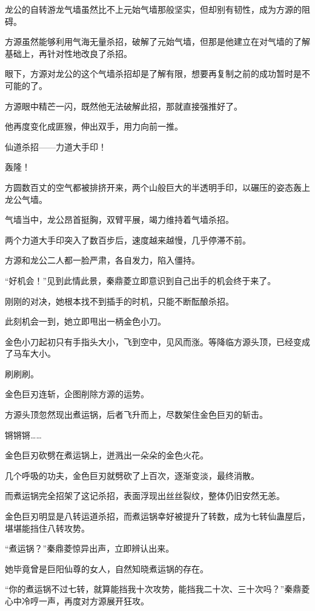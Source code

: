 \begin{this_body}
龙公的自转游龙气墙虽然比不上元始气墙那般坚实，但却别有韧性，成为方源的阻碍。

方源虽然能够利用气海无量杀招，破解了元始气墙，但那是他建立在对气墙的了解基础上，再针对性地改良了杀招。

眼下，方源对龙公的这个气墙杀招却是了解有限，想要再复制之前的成功暂时是不可能的了。

方源眼中精芒一闪，既然他无法破解此招，那就直接强推好了。

他再度变化成匪猴，伸出双手，用力向前一推。

仙道杀招——力道大手印！

轰隆！

方圆数百丈的空气都被排挤开来，两个山般巨大的半透明手印，以碾压的姿态轰上龙公气墙。

气墙当中，龙公昂首挺胸，双臂平展，竭力维持着气墙杀招。

两个力道大手印突入了数百步后，速度越来越慢，几乎停滞不前。

方源和龙公二人都一脸严肃，各自发力，陷入僵持。

“好机会！”见到此情此景，秦鼎菱立即意识到自己出手的机会终于来了。

刚刚的对决，她根本找不到插手的时机，只能不断酝酿杀招。

此刻机会一到，她立即甩出一柄金色小刀。

金色小刀起初只有手指头大小，飞到空中，见风而涨。等降临方源头顶，已经变成了马车大小。

刷刷刷。

金色巨刃连斩，企图削除方源的运势。

方源头顶忽然现出煮运锅，后者飞升而上，尽数架住金色巨刃的斩击。

锵锵锵……

金色巨刃砍劈在煮运锅上，迸溅出一朵朵的金色火花。

几个呼吸的功夫，金色巨刃就劈砍了上百次，逐渐变淡，最终消散。

而煮运锅完全招架了这记杀招，表面浮现出丝丝裂纹，整体仍旧安然无恙。

金色巨刃明显是八转运道杀招，而煮运锅幸好被提升了转数，成为七转仙蛊屋后，堪堪能挡住八转攻势。

“煮运锅？”秦鼎菱惊异出声，立即辨认出来。

她毕竟曾是巨阳仙尊的女人，自然知晓煮运锅的存在。

“你的煮运锅不过七转，就算能挡我十次攻势，能挡我二十次、三十次吗？”秦鼎菱心中冷哼一声，再度对方源展开狂攻。


\end{this_body}
